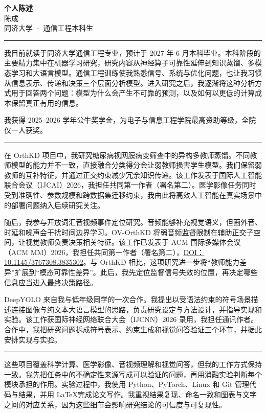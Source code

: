 \documentclass[UTF8,fontset=none,11pt,a4paper]{ctexart}
\newcommand{\statementsection}[1]{%
  \Needspace{7\baselineskip}%
  \vspace{5pt}%
  \noindent{\large\bfseries\color{accent}#1}\par
  \vspace{-3pt}\noindent\textcolor{line}{\rule{\textwidth}{0.65pt}}\vspace{3pt}%
}
\begin{document}
\begin{center}
  {\fontsize{25}{29}\selectfont\bfseries\color{accent}个人陈述}\\[5pt]
  {\large 陈成}\\[2pt]
  {\color{muted}同济大学 · 通信工程本科生}
\end{center}

\vspace{5pt}

\statementsection{研究起点}

我目前就读于同济大学通信工程专业，预计于 2027 年 6 月本科毕业。本科阶段的主要精力集中在机器学习研究，研究内容从神经算子可靠性延伸到知识蒸馏、多模态学习和大语言模型。通信工程训练使我熟悉信号、系统与优化问题，也让我习惯从信息表示、传递和决策三个层面分析模型。进入研究之后，我逐渐将这种分析方式用于回答两个问题：模型为什么会产生不可靠的预测，以及如何以更低的计算成本保留真正有用的信息。

我获得 2025--2026 学年公牛奖学金，为电子与信息工程学院最高资助等级，全院仅一人获奖。

\statementsection{科研经历}

在 OrthKD 项目中，我研究糖尿病视网膜病变筛查中的异构多教师蒸馏。不同教师模型的能力并不一致，直接融合分类得分会让弱教师损害学生模型。我们保留弱教师的互补特征，并通过正交约束减少冗余知识传递。该工作发表于国际人工智能联合会议（IJCAI）2026，我担任共同第一作者（署名第二）。医学影像任务同时受到准确性、参数规模和跨数据集迁移约束，我由此将高效人工智能在真实场景中的部署问题纳入后续研究关注。

随后，我参与开放词汇音视频事件定位研究。音频能够补充视觉语义，但画外音、时延和噪声会干扰时间边界学习。OV-OrthKD 将弱音频监督限制在辅助正交子空间，让视觉教师负责决策相关特征。该工作已发表于 ACM 国际多媒体会议（ACM MM）2026，我担任共同第一作者（署名第二），\href{https://doi.org/10.1145/3767308.3835302}{DOI：10.1145/3767308.3835302}。与 OrthKD 相比，这项研究进一步将“教师能力差异”扩展到“模态可靠性差异”。此后，我先定位监督信号失效的位置，再决定哪些信息应当进入最终决策路径。

DeepYOLO 来自我与低年级同学的一次合作。我提出以受语法约束的符号场景描述连接图像与纯文本大语言模型的思路，负责研究设定与方法设计，并指导实现和实验。该工作获国际神经网络联合大会（IJCNN）2026 录用，我担任通讯作者。合作中，我把研究问题拆成符号表示、约束生成和视觉问答验证三个环节，并据此安排实现与实验。

\statementsection{研究方法与能力}

这些项目覆盖科学计算、医学影像、音视频理解和视觉问答，但我的工作方式保持一致。我先把任务中的不确定性来源写成可以验证的问题，再用消融实验判断每个模块承担的作用。实验过程中，我使用 Python、PyTorch、Linux 和 Git 管理代码与结果，并用 \LaTeX 完成论文写作。我重视结果复现、命名一致和图表与文字之间的对应关系，因为这些细节会影响研究结论的可信度与可复现性。
\end{document}
